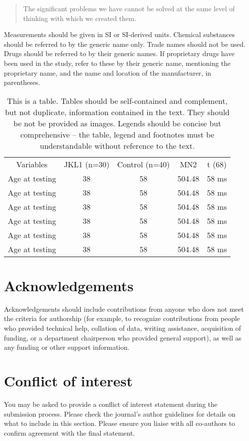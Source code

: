 \documentclass[alpha-refs]{wiley-article}
\begin{document}
\par\null

\begin{quote}
The significant problems we have cannot be solved at the same level of
thinking with which we created them.
\end{quote}

Measurements should be given in SI or SI-derived units. Chemical
substances should be referred to by the generic name only. Trade names
should not be used. Drugs should be referred to by their generic names.
If proprietary drugs have been used in the study, refer to these by
their generic name, mentioning the proprietary name, and the name and
location of the manufacturer, in parentheses.
\begin{table}[h!]
\centering
\normalsize\begin{tabulary}{1.0\textwidth}{CCCCC}
Variables & JKL1 (n=30) & Control (n=40) & MN2 & t (68) \\
Age at testing & 38 & 58 & 504.48 & 58 ms \\
Age at testing & 38 & 58 & 504.48 & 58 ms \\
Age at testing & 38 & 58 & 504.48 & 58 ms \\
Age at testing & 38 & 58 & 504.48 & 58 ms \\
Age at testing & 38 & 58 & 504.48 & 58 ms \\
Age at testing & 38 & 58 & 504.48 & 58 ms \\
\end{tabulary}
\caption{{This is a table. Tables should be self-contained and complement, but not
duplicate, information contained in the text. They should be not be
provided as images. Legends should be concise but comprehensive -- the
table, legend and footnotes must be understandable without reference to
the text.
{\label{536540}}%
}}
\end{table}\section*{Acknowledgements}\label{acknowledgements}

Acknowledgements should include contributions from anyone who does not
meet the criteria for authorship (for example, to recognize
contributions from people who provided technical help, collation of
data, writing assistance, acquisition of funding, or a department
chairperson who provided general support), as well as any funding or
other support information.

\section*{Conflict of interest}

{\label{644442}}

You may be asked to provide a conflict of interest statement during the
submission process. Please check the journal's author guidelines for
details on what to include in this section. Please ensure you liaise
with all co-authors to confirm agreement with the final statement.

\FloatBarrier

\end{document}
